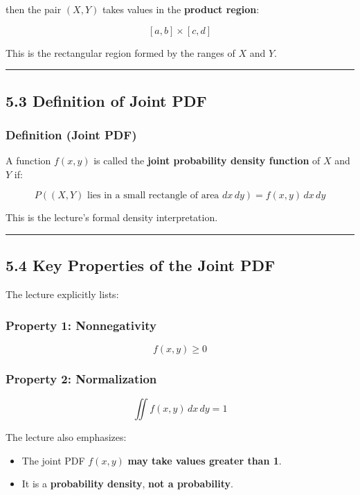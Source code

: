 \documentclass[12pt]{article}
\begin{document}
then the pair \((X,Y)\) takes values in the \textbf{product region}:

\[
[a,b]\times[c,d]
\]

This is the rectangular region formed by the ranges of \(X\) and \(Y\).

\hrule
\vspace{1em}

\subsection*{5.3 Definition of Joint PDF}

\subsubsection*{Definition (Joint PDF)}

A function \(f(x,y)\) is called the \textbf{joint probability density function} of \(X\) and \(Y\) if:

\[
P((X,Y)\text{ lies in a small rectangle of area }dx\,dy)=f(x,y)\,dx\,dy
\]

This is the lecture’s formal density interpretation.

\hrule
\vspace{1em}

\subsection*{5.4 Key Properties of the Joint PDF}

The lecture explicitly lists:

\subsubsection*{Property 1: Nonnegativity}

\[
f(x,y)\ge 0
\]

\subsubsection*{Property 2: Normalization}

\[
\iint f(x,y)\,dx\,dy = 1
\]

The lecture also emphasizes:

\begin{itemize}
    \item The joint PDF \(f(x,y)\) \textbf{may take values greater than 1}.
    \item It is a \textbf{probability density}, \textbf{not a probability}.
\end{itemize}
\end{document}
